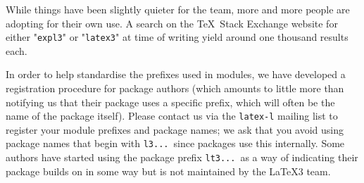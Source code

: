 \documentclass{ltnews}
\begin{document}
While things have been slightly quieter for the team, more and more people are adopting  for their own use.
A search on the \TeX\ Stack Exchange website for either "\texttt{expl3}" or "\texttt{latex3}" at time of writing yield around one thousand results each.

In order to help standardise the prefixes used in  modules, we have developed a registration procedure for package authors (which amounts to little more than notifying us that their package uses a specific prefix, which will often be the name of the package itself).
Please contact us via the \texttt{latex-l} mailing list to register your module prefixes and package names; we ask that you avoid using package names that begin with \texttt{l3...}\ since  packages use this internally.
Some authors have started using the package prefix \texttt{lt3...}\ as a way of indicating their package builds on  in some way but is not maintained by the \LaTeX3 team.
\end{document}
